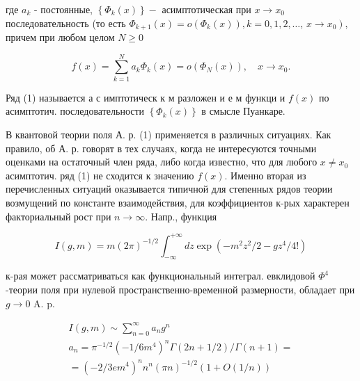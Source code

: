 \documentclass[10pt]{article}
\begin{document}
где $a_{k}$ - постоянные, $\left\{\Phi_{k}(x)\right\}-$ асимптотическая при $x \rightarrow x_{0}$ последовательность (то есть $\Phi_{k+1}(x)=o\left(\Phi_{k}(x)\right), k=0,1,2, \ldots$, $\left.x \rightarrow x_{0}\right)$, причем при любом целом $N \geqslant 0$



\[

f(x)=\sum_{k=1}^{N} a_{k} \Phi_{k}(x)=o\left(\Phi_{N}(x)\right), \quad x \rightarrow x_{0} .

\]



Ряд (1) называется а с имптотическ к м разложен и е м функци и $f(x)$ по асимптотич. последовательности $\left\{\Phi_{k}(x)\right\}$ в смысле Пуанкаре.



В квантовой теории поля А. р. (1) применяется в различных ситуациях. Как правило, об А. р. говорят в тех случаях, когда не интересуются точными оценками на остаточный член ряда, либо когда известно, что для любого $x \neq x_{0}$ асимптотич. ряд (1) не сходится к значению $f(x)$. Именно вторая из перечисленных ситуаций оказывается типичной для степенных рядов теории возмущений по константе взаимодействия, для коэффициентов к-рых характерен факториальный рост при $n \rightarrow \infty$. Напр., функция



\[

I(g, m)=m(2 \pi)^{-1 / 2} \int_{-\infty}^{+\infty} d z \exp \left(-m^{2} z^{2} / 2-g z^{4} / 4 !\right)

\]



к-рая может рассматриваться как функциональный интеграл. евклидовой $\Phi^{4}$-теории поля при нулевой пространственно-временной размерности, обладает при $g \rightarrow 0$ A. p.



\[

\begin{gathered}

I(g, m) \sim \sum_{n=0}^{\infty} a_{n} g^{n} \\

a_{n}=\pi^{-1 / 2}\left(-1 / 6 m^{4}\right)^{n} \Gamma(2 n+1 / 2) / \Gamma(n+1)= \\

=\left(-2 / 3 e m^{4}\right)^{n} n^{n}(\pi n)^{-1 / 2}(1+O(1 / n))

\end{gathered}

\]
\end{document}
